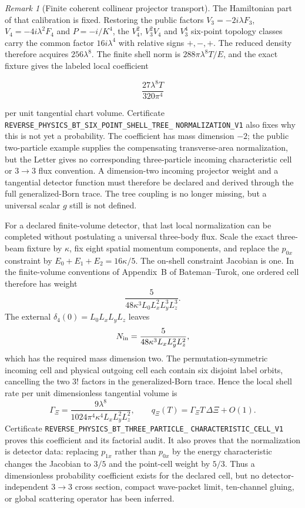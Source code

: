 \documentclass[11pt]{article}
\theoremstyle{definition}
\theoremstyle{remark}
\newtheorem{remark}[theorem]{Remark}
\begin{document}
\begin{remark}[Finite coherent collinear projector transport]
The Hamiltonian part of that calibration is fixed.  Restoring the public
factors $V_3=-2i\lambda F_3$, $V_4=-4i\lambda^2F_4$ and
$P=-i/K^4$, the $V_4^2$, $V_3^2V_4$ and $V_3^4$ six-point topology classes
carry the common factor $16i\lambda^4$ with relative signs $+,-,+$.
The reduced density therefore acquires $256\lambda^8$.  The finite shell norm
is $288\pi\lambda^8T/E$, and the exact fixture gives the labeled local
coefficient

\[
 \frac{27\lambda^8T}{320\pi^4}
\]

per unit tangential chart volume.  Certificate
\texttt{REVERSE\_PHYSICS\_BT\_SIX\_POINT\_SHELL\_TREE\_}
\allowbreak\texttt{NORMALIZATION\_V1}
also fixes why this is not yet a probability.  The coefficient has mass
dimension $-2$; the public two-particle example supplies the compensating
transverse-area normalization, but the Letter gives no corresponding
three-particle incoming characteristic cell or $3\to3$ flux convention.  A
dimension-two incoming projector weight and a tangential detector function
must therefore be declared and derived through the full generalized-Born
trace.  The tree coupling is no longer missing, but a universal scalar $g$
still is not defined.

For a declared finite-volume detector, that last local normalization can be
completed without postulating a universal three-body flux.  Scale the exact
three-beam fixture by $\kappa$, fix eight spatial momentum components, and
replace the $p_{0x}$ constraint by
$E_0+E_1+E_2=16\kappa/5$.  The on-shell constraint Jacobian is one.  In the
finite-volume conventions of Appendix~B of Bateman--Turok, one ordered cell
therefore has weight
\[
 \frac{5}{48\kappa^3L_0L_x^2L_y^3L_z^3}.
\]
The external $\delta_4(0)=L_0L_xL_yL_z$ leaves
\[
 N_{\rm in}=\frac{5}{48\kappa^3L_xL_y^2L_z^2},
\]
which has the required mass dimension two.  The permutation-symmetric
incoming cell and physical outgoing cell each contain six disjoint label
orbits, cancelling the two $3!$ factors in the generalized-Born trace.  Hence
the local shell rate per unit dimensionless tangential volume is
\[
 \Gamma_\Xi=\frac{9\lambda^8}
 {1024\pi^4\kappa^4L_xL_y^2L_z^2},
 \qquad q_\Xi(T)=\Gamma_\Xi T\,\Delta\Xi+O(1).
\]
Certificate
\texttt{REVERSE\_PHYSICS\_BT\_THREE\_PARTICLE\_}
\allowbreak\texttt{CHARACTERISTIC\_CELL\_V1}
proves this coefficient and its factorial audit.  It also proves that the
normalization is detector data: replacing $p_{1x}$ rather than $p_{0x}$ by
the energy characteristic changes the Jacobian to $3/5$ and the point-cell
weight by $5/3$.  Thus a dimensionless probability coefficient exists for
the declared cell, but no detector-independent $3\to3$ cross section,
compact wave-packet limit, ten-channel gluing, or global scattering operator
has been inferred.


\end{remark}
\end{document}
